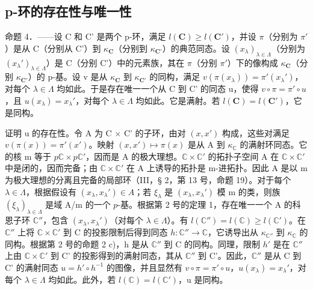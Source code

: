 \subsection{p-环的存在性与唯一性}

命题 4．——设 C 和 C' 是两个 p-环，满足 \(l(\mathbf{C}) \geqslant l(\mathbf{C}')\)，并设 \(\pi\)（分别为 \(\pi'\)）是从 C（分别从 C'）到 \(\kappa_{\mathbf{C}}\)（分别到 \(\kappa_{\mathbf{C}'}\)）的典范同态。设 \((x_{\lambda})_{\lambda \in \Lambda}\)（分别为 \((x_{\lambda}')_{\lambda \in \Lambda}\)）是 C（分别 C'）中的元素族，其在 \(\pi\)（分别 \(\pi'\)）下的像构成 \(\kappa_{\mathbf{C}}\)（分别 \(\kappa_{\mathbf{C}'}\)）的 p-基。设 v 是从 \(\kappa_{\mathbf{C}}\) 到 \(\kappa_{\mathbf{C}'}\) 的同构，满足 \(v(\pi(x_{\lambda})) = \pi'(x_{\lambda}')\)，对每个 \(\lambda \in \Lambda\) 均如此。于是存在唯一一个从 C 到 C' 的同态 u，使得 \(v \circ \pi = \pi' \circ u\)，且 \(u(x_{\lambda}) = x_{\lambda}'\)，对每个 \(\lambda \in \Lambda\) 均如此。它是满射。若 \(l(\mathbf{C}) = l(\mathbf{C}')\)，它是同构。

证明 u 的存在性。令 A 为 C × C' 的子环，由对 \((x, x')\) 构成，这些对满足 \(v(\pi(x)) = \pi'(x')\)。映射 \((x, x') \mapsto \pi(x)\) 是从 A 到 \(\kappa_{\mathbb{C}}\) 的满射环同态。它的核 m 等于 \(p\mathbb{C} \times p\mathbb{C}'\)，因而是 A 的极大理想。\(\mathbb{C} \times \mathbb{C}'\) 的拓扑子空间 A 在 \(\mathbb{C} \times \mathbb{C}'\) 中是闭的，因而完备；由 \(\mathbb{C} \times \mathbb{C}'\) 在 A 上诱导的拓扑是 m-进拓扑。因此 A 是以 m 为极大理想的分离且完备的局部环（III，§ 2，第 13 号，命题 19）。对于每个 \(\lambda \in \Lambda\)，根据假设有 \((x_{\lambda}, x_{\lambda}') \in A\)；若 \(\xi_{\lambda}\) 是 \((x_{\lambda}, x_{\lambda}')\) 模 m 的类，则族 \((\xi_{\lambda})_{\lambda \in \Lambda}\) 是域 A/m 的一个 \(p\)-基。根据第 2 号的定理 1，存在唯一一个 A 的科恩子环 \(\mathbb{C}''\)，包含 \((x_{\lambda}, x_{\lambda}')\)（对每个 \(\lambda \in \Lambda\)）。有 \(l(\mathbb{C}'') = l(\mathbb{C}) \geqslant l(\mathbb{C}')\)。在 \(\mathbb{C}''\) 上将 \(\mathbb{C} \times \mathbb{C}'\) 到 C 的投影限制后得到同态 \(h: \mathbb{C}'' \to \mathbb{C}\)，它诱导出从 \(\kappa_{\mathbb{C}''}\) 到 \(\kappa_{\mathbb{C}}\) 的同构。根据第 2 号的命题 2 c)，h 是从 \(\mathbb{C}''\) 到 C 的同构。同理，限制 \(h'\) 是在 \(\mathbb{C}''\) 上由 \(\mathbb{C} \times \mathbb{C}'\) 到 C' 的投影得到的满射同态，其从 \(\mathbb{C}''\) 到 C'。因此，\(\mathbb{C}''\) 是从 C 到 C' 的满射同态 \(u = h' \circ h^{-1}\) 的图像，并且显然有 \(v \circ \pi = \pi' \circ u\)，\(u(x_{\lambda}) = x_{\lambda}'\)，对每个 \(\lambda \in \Lambda\) 均如此。此外，若 \(l(\mathbb{C}) = l(\mathbb{C}')\)，u 是同构。

